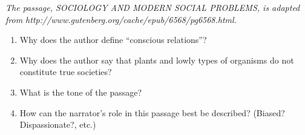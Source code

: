 \textit{The passage, SOCIOLOGY AND MODERN SOCIAL PROBLEMS, is adapted from http://www.gutenberg.org/cache/epub/6568/pg6568.html.}

\bigskip
\begin{enumerate}

\item Why does the author define ``conscious relations''? \hrulefill

\item Why does the author say that plants and lowly types of organisms do not constitute true societies? \hrulefill

\item What is the tone of the passage? \hrulefill

\item How can the narrator's role in this passage best be described? (Biased? Dispassionate?, etc.) \hrulefill

\end{enumerate}
